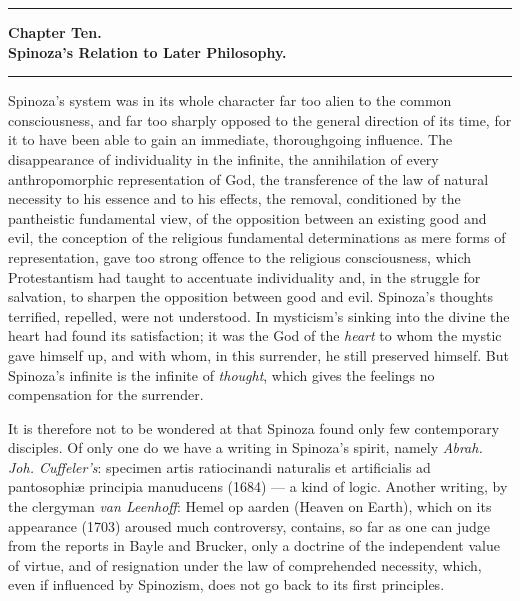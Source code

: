 \documentclass[12pt,a4paper,openany]{book}
\newcommand{\opage}[1]{\marginnote{\footnotesize\textit{[#1]}}}
\begin{document}
\bigskip
\begin{center}\rule{2.5cm}{0.4pt}\end{center}
\bigskip

\begin{center}
{\large\textbf{Chapter Ten.}}\\[4pt]
\textbf{Spinoza's Relation to Later Philosophy.}\\[6pt]
\rule{2cm}{0.4pt}
\end{center}
\bigskip

Spinoza's system was in its whole character far too alien
to the common consciousness, and far too sharply opposed to the
\opage{182} general direction of its time, for it to have been able to gain
an immediate, thoroughgoing influence. The disappearance of individuality
in the infinite, the annihilation of every anthropomorphic
representation of God, the transference of the law of natural necessity
to his essence and to his effects,
the removal, conditioned by the pantheistic fundamental view,
of the opposition between an existing good and evil, the conception
of the religious fundamental determinations as mere forms of representation,
gave too strong offence to the religious consciousness,
which Protestantism had taught to accentuate individuality
and, in the struggle for salvation, to sharpen the opposition
between good and evil. Spinoza's thoughts terrified,
repelled, were not understood. In mysticism's sinking into the
divine the heart had found its satisfaction;
it was the God of the \emph{heart} to whom the mystic gave himself up,
and with whom, in this surrender, he still preserved
himself. But Spinoza's infinite is the infinite of \emph{thought}, which
gives the feelings no compensation for the surrender.

It is therefore not to be wondered at that Spinoza found
only few contemporary disciples. Of only one do we have a
writing in Spinoza's spirit, namely \emph{Abrah. Joh. Cuffeler's}:
specimen artis ratiocinandi naturalis et artificialis ad pantosophiæ
principia manuducens (1684) --- a kind of logic. Another
writing, by the clergyman \emph{van Leenhoff}: Hemel op aarden
(Heaven on Earth), which on its appearance (1703) aroused
much controversy, contains, so far as one can judge from
the reports in Bayle and Brucker, only a doctrine of the independent
value of virtue, and of resignation under the law of comprehended
necessity, which, even if influenced by Spinozism,
does not go back to its first principles.
\end{document}
